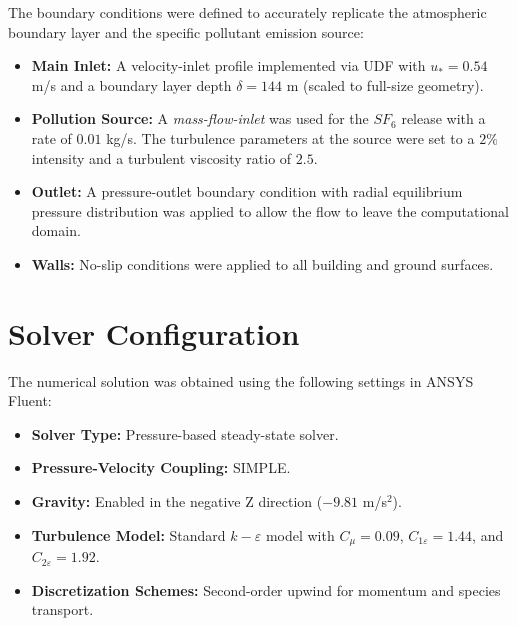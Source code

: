 \documentclass[11pt,a4paper]{report}
\begin{document}
\bigskip

The boundary conditions were defined to accurately replicate the atmospheric boundary layer and the specific pollutant emission source:

\begin{itemize}
    \item \textbf{Main Inlet:} A velocity-inlet profile implemented via UDF with $u_* = 0.54$ m/s and a boundary layer depth $\delta = 144$ m (scaled to full-size geometry).
    \item \textbf{Pollution Source:} A \textit{mass-flow-inlet} was used for the $SF_6$ release with a rate of $0.01$ kg/s. The turbulence parameters at the source were set to a $2\%$ intensity and a turbulent viscosity ratio of $2.5$.
   \item \textbf{Outlet:} A pressure-outlet boundary condition with radial equilibrium pressure distribution was applied to allow the flow to leave the computational domain.
    \item \textbf{Walls:} No-slip conditions were applied to all building and ground surfaces.
\end{itemize}





\section{Solver Configuration}
The numerical solution was obtained using the following settings in ANSYS Fluent:
\begin{itemize}
  \item \textbf{Solver Type:} Pressure-based steady-state solver.
\item \textbf{Pressure-Velocity Coupling:} SIMPLE.
\item \textbf{Gravity:} Enabled in the negative Z direction ($-9.81$ m/s$^2$).
\item \textbf{Turbulence Model:} Standard $k-\varepsilon$ model with $C_\mu = 0.09$, $C_{1\varepsilon} = 1.44$, and $C_{2\varepsilon} = 1.92$.
\item \textbf{Discretization Schemes:} Second-order upwind for momentum and species transport.
\end{itemize}
\end{document}
